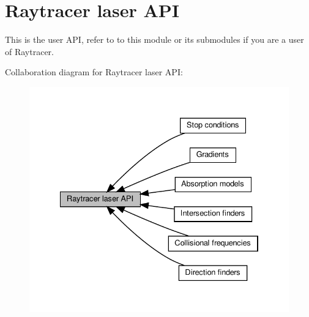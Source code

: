 \hypertarget{group__api}{}\section{Raytracer laser A\+PI}
\label{group__api}


This is the user A\+PI, refer to to this module or its submodules if you are a user of Raytracer.  


Collaboration diagram for Raytracer laser A\+PI\+:
\nopagebreak
\begin{figure}[H]
\begin{center}
\leavevmode
\includegraphics[width=334pt]{group__api}
\end{center}
\end{figure}
